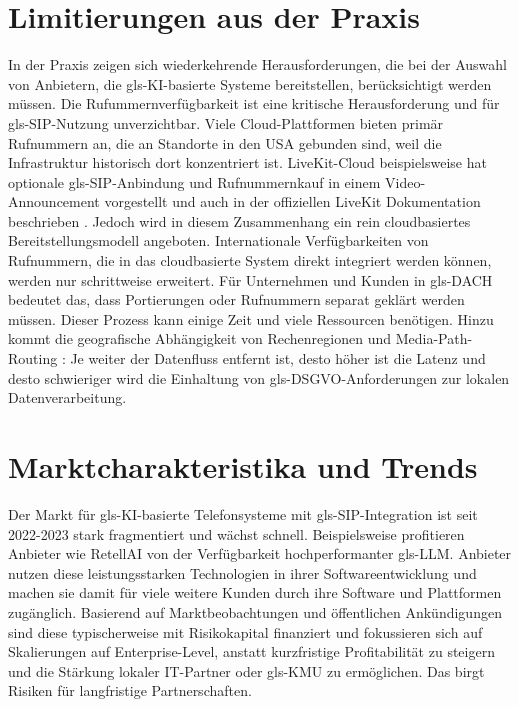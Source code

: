 \section{Limitierungen aus der Praxis}
In der Praxis zeigen sich wiederkehrende Herausforderungen, die bei der Auswahl von Anbietern, die \gls{gls-KI}-basierte Systeme bereitstellen, berücksichtigt werden müssen. Die Rufummernverfügbarkeit ist eine kritische Herausforderung und für \gls{gls-SIP}-Nutzung unverzichtbar. Viele Cloud-Plattformen bieten primär Rufnummern an, die an Standorte in den USA gebunden sind, weil die Infrastruktur historisch dort konzentriert ist. LiveKit-Cloud beispielsweise hat optionale \gls{gls-SIP}-Anbindung und Rufnummernkauf in einem Video-Announcement vorgestellt und auch in der offiziellen LiveKit Dokumentation beschrieben \parencite{livekit_telephony_docs}. Jedoch wird in diesem Zusammenhang ein rein cloudbasiertes Bereitstellungsmodell angeboten. Internationale Verfügbarkeiten von Rufnummern, die in das cloudbasierte System direkt integriert werden können, werden nur schrittweise erweitert. Für Unternehmen und Kunden in \gls{gls-DACH} bedeutet das, dass Portierungen oder Rufnummern separat geklärt werden müssen. Dieser Prozess kann einige Zeit und viele Ressourcen benötigen. Hinzu kommt die geografische Abhängigkeit von Rechenregionen und Media-Path-Routing \parencite{rfc3550}: Je weiter der Datenfluss entfernt ist, desto höher ist die Latenz \parencite{ITU-T-G114} und desto schwieriger wird die Einhaltung von \gls{gls-DSGVO}-Anforderungen zur lokalen Datenverarbeitung.

\section{Marktcharakteristika und Trends}
Der Markt für \gls{gls-KI}-basierte Telefonsysteme mit \gls{gls-SIP}-Integration ist seit 2022-2023 stark fragmentiert und wächst schnell. Beispielsweise profitieren Anbieter wie RetellAI \parencite{retellai_sip_blog} von der Verfügbarkeit hochperformanter \gls{gls-LLM}. Anbieter nutzen diese leistungsstarken Technologien in ihrer Softwareentwicklung und machen sie damit für viele weitere Kunden durch ihre Software und Plattformen zugänglich.
Basierend auf Marktbeobachtungen und öffentlichen Ankündigungen sind diese typischerweise mit Risikokapital finanziert und fokussieren sich auf Skalierungen auf Enterprise-Level, anstatt kurzfristige Profitabilität zu steigern und die Stärkung lokaler IT-Partner oder \gls{gls-KMU} zu ermöglichen. \parencite{retellai_seed_blog} Das birgt Risiken für langfristige Partnerschaften.

